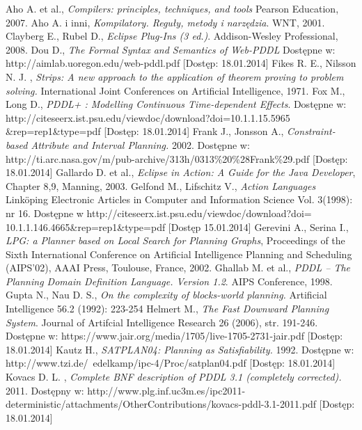 
\begin{thebibliography}{1}

Aho A. et al., \emph{Compilers: principles,
techniques, and tools} Pearson Education, 2007.
 Aho A. i inni, \emph{Kompilatory. Reguły, metody i narzędzia}.
WNT, 2001.
 Clayberg E., Rubel D., \emph{Eclipse Plug-Ins (3 ed.)}. Addison-Wesley Professional, 2008. 
 Dou D., \emph{The Formal Syntax and Semantics of Web-PDDL} Dostępne w: http://aimlab.uoregon.edu/web-pddl.pdf [Dostęp: 18.01.2014]
 Fikes R. E., Nilsson N. J. , \emph{Strips: A new approach to the application of theorem proving to problem solving.} International Joint Conferences on Artificial Intelligence, 1971.
 Fox M., Long D., \emph{PDDL+ : Modelling Continuous Time-dependent Effects}. Dostępne w: http://citeseerx.ist.psu.edu/viewdoc/download?doi=10.1.1.15.5965 \&{}rep=rep1\&{}type=pdf [Dostęp: 18.01.2014]
 Frank J., Jonsson A., \emph{Constraint-based Attribute and Interval Planning.} 2002. Dostępne w:
http://ti.arc.nasa.gov/m/pub-archive/313h/0313\%20\%28Frank\%29.pdf [Dostęp: 18.01.2014] 
 Gallardo D. et al., \emph{Eclipse in Action: A Guide for the Java Developer}, Chapter 8,9, Manning, 2003.
 Gelfond M., Lifschitz V., \emph{Action Languages} Linköping Electronic Articles in
Computer and Information Science
Vol. 3(1998): nr 16. Dostępne w http://citeseerx.ist.psu.edu/viewdoc/download?doi= 10.1.1.146.4665\&{}rep=rep1\&{}type=pdf [Dostęp 15.01.2014]
 Gerevini A., Serina I., \emph{LPG: a Planner based on Local Search for Planning Graphs}, Proceedings of the Sixth International Conference on Artificial Intelligence Planning and Scheduling (AIPS'02), AAAI Press, Toulouse, France, 2002.
 Ghallab M. et al., \emph{PDDL -- The Planning Domain Definition Language. Version 1.2}.
AIPS Conference, 1998.
Gupta N.,  Nau D. S., \emph{On the complexity of blocks-world planning.} Artificial Intelligence 56.2 (1992): 223-254
 Helmert M., \emph{The Fast Downward Planning System}. Journal of Artifcial Intelligence Research 26 (2006), str. 191-246. Dostępne w: https://www.jair.org/media/1705/live-1705-2731-jair.pdf [Dostęp: 18.01.2014]
 Kautz H., \emph{SATPLAN04: Planning as Satisfiability.} 1992. Dostępne w:
http://www.tzi.de/~edelkamp/ipc-4/Proc/satplan04.pdf [Dostęp: 18.01.2014]
 Kovacs D. L. , \emph{Complete BNF description of PDDL 3.1 (completely corrected).} 2011. Dostępny w: http://www.plg.inf.uc3m.es/ipc2011-deterministic/attachments/OtherContributions/kovacs-pddl-3.1-2011.pdf [Dostęp: 18.01.2014]

\end{thebibliography}
